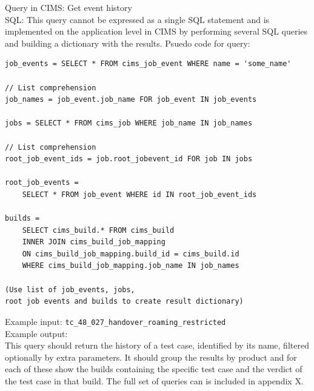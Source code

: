 \label{q:tchistory}
Query in CIMS: Get event history \\
SQL: This query cannot be expressed as a single SQL statement and is implemented on the application level in CIMS by performing several SQL queries and building a dictionary with the results. Psuedo code for query:
\begin{verbatim}
job_events = SELECT * FROM cims_job_event WHERE name = 'some_name'

// List comprehension
job_names = job_event.job_name FOR job_event IN job_events 

jobs = SELECT * FROM cims_job WHERE job_name IN job_names

// List comprehension
root_job_event_ids = job.root_jobevent_id FOR job IN jobs

root_job_events = 
    SELECT * FROM job_event WHERE id IN root_job_event_ids

builds = 
    SELECT cims_build.* FROM cims_build
    INNER JOIN cims_build_job_mapping
    ON cims_build_job_mapping.build_id = cims_build.id
    WHERE cims_build_job_mapping.job_name IN job_names

(Use list of job_events, jobs, 
root job events and builds to create result dictionary)

\end{verbatim}
Example input: {\tt tc\_48\_027\_handover\_roaming\_restricted } \\
Example output: \\
This query should return the history of a test case, identified by its name, filtered optionally by extra parameters. It should group the results by product and for each of these show the builds containing the specific test case and the verdict of the test case in that build. The full set of queries can is included in appendix X.



